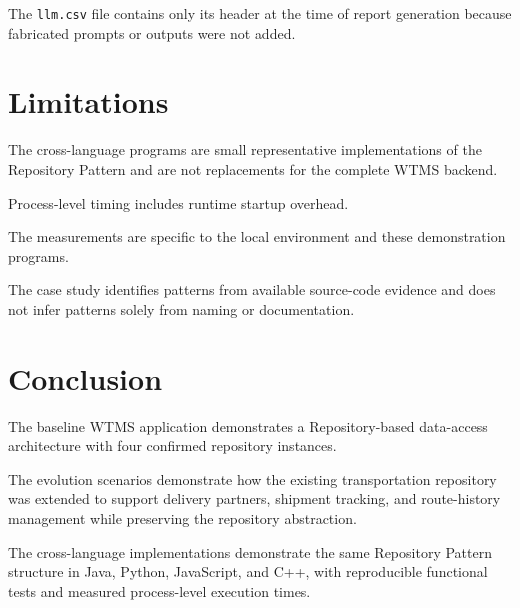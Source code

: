 \documentclass[12pt,a4paper]{article}
\begin{document}
The \texttt{llm.csv} file contains only its header at the time of report generation because fabricated prompts or outputs were not added.

\section{Limitations}

The cross-language programs are small representative implementations of the Repository Pattern and are not replacements for the complete WTMS backend.

Process-level timing includes runtime startup overhead.

The measurements are specific to the local environment and these demonstration programs.

The case study identifies patterns from available source-code evidence and does not infer patterns solely from naming or documentation.

\section{Conclusion}

The baseline WTMS application demonstrates a Repository-based data-access architecture with four confirmed repository instances.

The evolution scenarios demonstrate how the existing transportation repository was extended to support delivery partners, shipment tracking, and route-history management while preserving the repository abstraction.

The cross-language implementations demonstrate the same Repository Pattern structure in Java, Python, JavaScript, and C++, with reproducible functional tests and measured process-level execution times.
\end{document}

